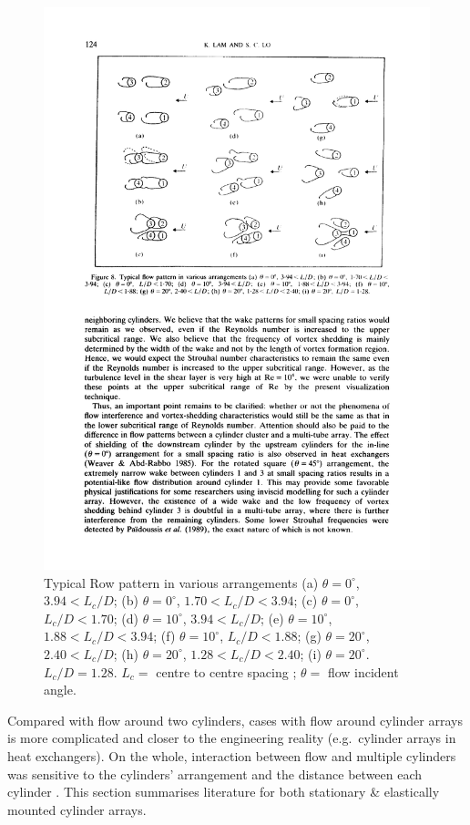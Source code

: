 \begin{figure}[tbp]
	\centering
	\includegraphics[width=0.7\linewidth]{Figs/visual4cylinders}
	\caption{Typical Row pattern in various arrangements (a) $ \theta = 0^\circ $, $ 3.94 < L_c/D $; (b) $ \theta = 0^\circ $, $ 1.70 < L_c/D < 3.94 $; (c) $ \theta=0^\circ $, $ L_c/D < 1.70 $; (d) $ \theta= 10^\circ $, $ 3.94< L_c/D  $; (e) $ \theta= 10^\circ $, $1.88< L_c/D <3.94$; (f) $ \theta= 10^\circ $, $ L_c/D < 1.88 $; (g) $ \theta= 20^\circ $, $ 2.40 < L_c/D $; (h) $ \theta= 20^\circ $, $ 1.28 < L_c/D < 2.40 $; (i) $ \theta= 20^\circ $. $ L_c/D = 1.28 $. $ L_c=$ centre to centre spacing ; $ \theta=$ flow incident angle.  \cite{Lam1992}}
	\label{fig:visual4cylinders}
\end{figure}

Compared with flow around two cylinders, cases with flow around cylinder arrays is more complicated and closer to the engineering reality (e.g.\ cylinder arrays in heat exchangers). On the whole, interaction between flow and multiple cylinders was sensitive to the cylinders' arrangement and the distance between each cylinder \cite{zhao2015flow}. This section summarises literature for both stationary \& elastically mounted cylinder arrays.

